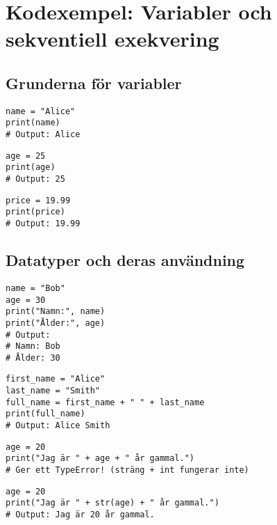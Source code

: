 \section{Kodexempel: Variabler och sekventiell exekvering}
\label{examples:variables}
\subsection*{Grunderna för variabler}

\begin{lstlisting}[title=Exempel 1: Skapa en variabel]
name = "Alice"
print(name)
# Output: Alice
\end{lstlisting}

\begin{lstlisting}[title=Exempel 2: Variabel med heltal]
age = 25
print(age)
# Output: 25
\end{lstlisting}

\begin{lstlisting}[title=Exempel 3: Variabel med flyttal]
price = 19.99
print(price)
# Output: 19.99
\end{lstlisting}

\subsection*{Datatyper och deras användning}

\begin{lstlisting}[title=Exempel 4: Kombinera variabler och text]
name = "Bob"
age = 30
print("Namn:", name)
print("Ålder:", age)
# Output:
# Namn: Bob
# Ålder: 30
\end{lstlisting}

\begin{lstlisting}[title=Exempel 5: Konkatenering av strängar]
first_name = "Alice"
last_name = "Smith"
full_name = first_name + " " + last_name
print(full_name)
# Output: Alice Smith
\end{lstlisting}

\begin{lstlisting}[title=Exempel 6: Implicit datakonvertering är inte tillåten]
age = 20
print("Jag är " + age + " år gammal.")
# Ger ett TypeError! (sträng + int fungerar inte)
\end{lstlisting}

\begin{lstlisting}[title=Exempel 7: Konvertera till sträng för att undvika fel]
age = 20
print("Jag är " + str(age) + " år gammal.")
# Output: Jag är 20 år gammal.
\end{lstlisting}


